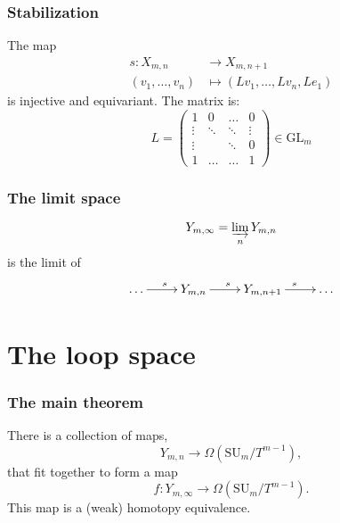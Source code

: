 \documentclass{beamer} %
\newcommand{\SUT}[1]{\SU_{#1}/T^{#1-1}}
\newcommand{\GL}{\mathrm{GL}}
\newcommand{\SU}{\mathrm{SU}}
\begin{document}
\begin{frame}
  \frametitle{Stabilization}
  \begin{definition}
    The map
    \begin{align*}
      s : X_{m,n} &\to X_{m,n+1} \\
      (v_1,\dots,v_n) &\mapsto (Lv_1,\dots,Lv_n,Le_1)
    \end{align*}
    is injective and equivariant. The matrix is:
    \[ L =
    \begin{pmatrix}
      1 & 0 & \dots & 0 \\
      \vdots & \ddots & \ddots & \vdots \\
      \vdots &  & \ddots & 0 \\
      1 & \dots & \dots & 1
    \end{pmatrix} \in \GL_m \]
  \end{definition}
\end{frame}

\begin{frame}
  \frametitle{The limit space}
  \begin{definition}
    \[ Y_{m,\infty} = \varinjlim_n Y_{m,n} \]
    is the limit of
    \[ \xymatrix{ \dots \ar[r]^s & Y_{m,n} \ar[r]^s & Y_{m,n+1} \ar[r]^s
      & \dots } \]
  \end{definition}
\end{frame}


\section{The loop space}


\begin{frame}
  \frametitle{The main theorem}
  \begin{theorem}
    There is a collection of maps,
    \[ Y_{m,n} \to \Omega(\SUT{m}), \]
    that fit together to form a map
    \[ f : Y_{m,\infty} \to \Omega(\SUT{m}). \]
    This map is a (weak) homotopy equivalence.
  \end{theorem}
\end{frame}
\end{document}
